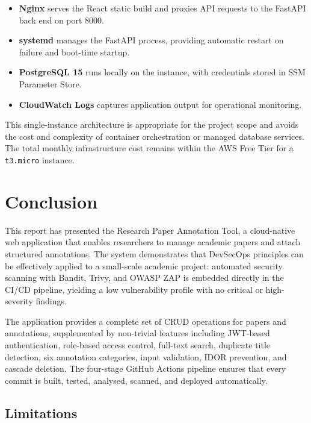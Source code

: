 \documentclass[conference]{IEEEtran}
\begin{document}
\begin{itemize}
    \item \textbf{Nginx} serves the React static build and proxies API requests to the FastAPI back end on port 8000.
    \item \textbf{systemd} manages the FastAPI process, providing automatic restart on failure and boot-time startup.
    \item \textbf{PostgreSQL 15} runs locally on the instance, with credentials stored in SSM Parameter Store.
    \item \textbf{CloudWatch Logs} captures application output for operational monitoring.
\end{itemize}

This single-instance architecture is appropriate for the project scope and avoids the cost and complexity of container orchestration or managed database services. The total monthly infrastructure cost remains within the AWS Free Tier for a \texttt{t3.micro} instance.

\section{Conclusion}
\label{sec:conclusion}

This report has presented the Research Paper Annotation Tool, a cloud-native web application that enables researchers to manage academic papers and attach structured annotations. The system demonstrates that DevSecOps principles can be effectively applied to a small-scale academic project: automated security scanning with Bandit, Trivy, and OWASP ZAP is embedded directly in the CI/CD pipeline, yielding a low vulnerability profile with no critical or high-severity findings.

The application provides a complete set of CRUD operations for papers and annotations, supplemented by non-trivial features including JWT-based authentication, role-based access control, full-text search, duplicate title detection, six annotation categories, input validation, IDOR prevention, and cascade deletion. The four-stage GitHub Actions pipeline ensures that every commit is built, tested, analysed, scanned, and deployed automatically.

\subsection{Limitations}
\end{document}
